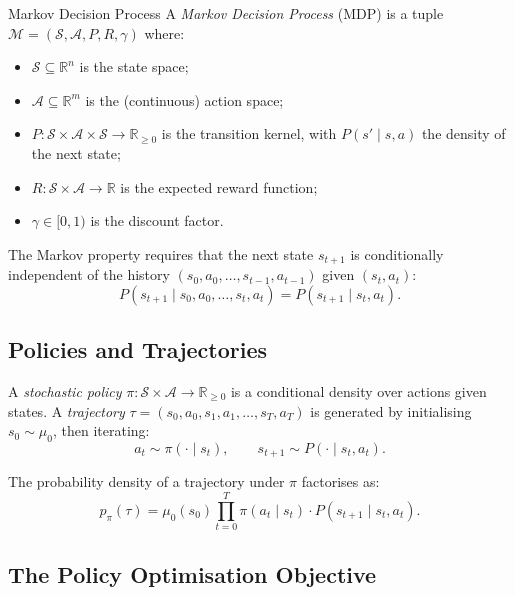 \documentclass[11pt, a4paper]{article}
\newcommand{\R}{\mathbb{R}}
\begin{document}
\begin{definition}{Markov Decision Process}{}
A \emph{Markov Decision Process} (MDP) is a tuple
$\mathcal{M} = (\mathcal{S}, \mathcal{A}, P, R, \gamma)$ where:
\begin{itemize}
    \item $\mathcal{S} \subseteq \R^n$ is the state space;
    \item $\mathcal{A} \subseteq \R^m$ is the (continuous) action space;
    \item $P : \mathcal{S} \times \mathcal{A} \times \mathcal{S} \to \R_{\geq 0}$
    is the transition kernel, with $P(s' \mid s, a)$ the density of the next state;
    \item $R : \mathcal{S} \times \mathcal{A} \to \R$ is the expected reward function;
    \item $\gamma \in [0, 1)$ is the discount factor.
\end{itemize}
\end{definition}

The Markov property requires that the next state $s_{t+1}$ is conditionally
independent of the history $(s_0, a_0, \ldots, s_{t-1}, a_{t-1})$ given $(s_t, a_t)$:
\begin{equation}
    P(s_{t+1} \mid s_0, a_0, \ldots, s_t, a_t) = P(s_{t+1} \mid s_t, a_t).
\end{equation}

\subsection{Policies and Trajectories}

A \emph{stochastic policy} $\pi : \mathcal{S} \times \mathcal{A} \to \R_{\geq 0}$
is a conditional density over actions given states.
A \emph{trajectory} $\tau = (s_0, a_0, s_1, a_1, \ldots, s_T, a_T)$ is generated
by initialising $s_0 \sim \mu_0$, then iterating:
\begin{equation}
    a_t \sim \pi(\cdot \mid s_t), \qquad s_{t+1} \sim P(\cdot \mid s_t, a_t).
\end{equation}

The probability density of a trajectory under $\pi$ factorises as:
\begin{equation}
    p_\pi(\tau) = \mu_0(s_0) \prod_{t=0}^{T} \pi(a_t \mid s_t) \cdot P(s_{t+1} \mid s_t, a_t).
\end{equation}

\subsection{The Policy Optimisation Objective}
\end{document}
